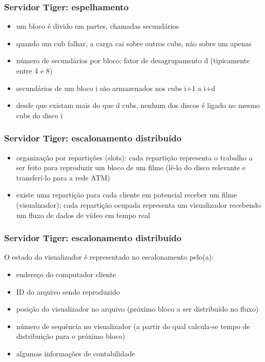 \documentclass[]{beamer}
\begin{document}
\begin{frame}
 \frametitle{Servidor Tiger: espelhamento}
 \begin{itemize}
   \item um bloco é divido em partes, chamadas secundários
   \item quando um cub falhar, a carga cai sobre outros cubs, não sobre um apenas
   \item número de secundários por bloco: fator de desagrupamento d (tipicamente entre 4 e 8)
   \item secundários de um bloco i são armazenados nos cubs i+1 a i+d
   \item desde que existam mais do que d cubs, nenhum dos discos é ligado
no mesmo cubs do disco i
  \end{itemize}
\end{frame}

\begin{frame}
 \frametitle{Servidor Tiger: escalonamento distribuído}
 \begin{itemize}
   \item organização por repartições (slots): cada repartição representa o trabalho a ser
feito para reproduzir um bloco de um filme (lê-lo do disco relevante e 
transferí-lo para a rede ATM)
   \item existe uma repartição para cada cliente em potencial receber um 
filme (visualizador); cada
repartição ocupada representa um visualizador recebendo um fluxo de dados de vídeo em tempo
real
  \end{itemize}
\end{frame}

\begin{frame}
 \frametitle{Servidor Tiger: escalonamento distribuído}
O estado do visualizador é representado no escalonamento pelo(a):
 \begin{itemize}
       \item endereço do computador cliente
       \item ID do arquivo sendo reproduzido
       \item posição do visualizador no arquivo (próximo bloco a ser distribuído no fluxo)
       \item número de sequência no visualizador (a partir do qual calcula-se tempo de
distribuição para o próximo bloco)
       \item algumas informações de contabilidade
 \end{itemize}
\end{frame}
\end{document}
